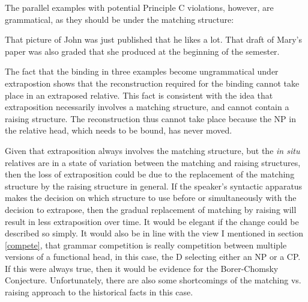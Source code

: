 \begin{exe}
\begin{xlist}
  \end{xlist}  
         
    
         
         
\end{exe}

\noindent The parallel examples with potential Principle C violations, however, are grammatical, as they should be under the matching structure:

\begin{exe}
    \ex That picture of John was just published that he likes a lot.
    \ex That draft of Mary's paper was also graded that she produced at the beginning of the semester.
\end{exe}


The fact that the binding in three examples become ungrammatical under extrapostion shows that the reconstruction required for the binding cannot take place in an extraposed relative. This fact is consistent with the idea that extraposition necessarily involves a matching structure, and cannot contain a raising structure. The reconstruction thus cannot take place because the NP in the relative head, which needs to be bound, has never moved.

Given that extraposition always involves the matching structure, but the \textsl{in situ} relatives are in a state of variation between the matching and raising structures, then the loss of extraposition could be due to the replacement of the matching structure by the raising structure in general. If the speaker's syntactic apparatus makes the decision on which structure to use before or simultaneously with the decision to extrapose, then the gradual replacement of matching by raising will result in less extraposition over time. It would be elegant if the change could be described so simply. It would also be in line with the view I mentioned in section \ref{compete}, that grammar competition is really competition between multiple versions of a functional head, in this case, the D selecting either an NP or a CP. If this were always true, then it would be evidence for the Borer-Chomsky Conjecture. Unfortunately, there are also some shortcomings of the matching vs. raising approach to the historical facts in this case.

